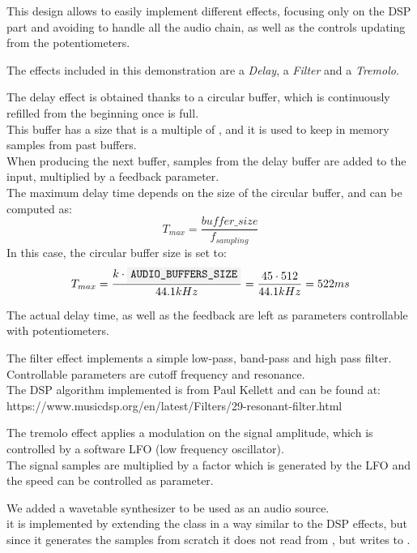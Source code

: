This design allows to easily implement different effects, focusing only on the DSP part and avoiding to handle all the audio chain, as well as the controls updating from the potentiometers.\par

The effects included in this demonstration are a \textit{Delay}, a \textit{Filter} and a \textit{Tremolo}.

The delay effect is obtained thanks to a circular buffer, which is continuously refilled from the beginning once is full.\\
This buffer has a size that is a multiple of , and it is used to keep in memory samples from past buffers.\\
When producing the next buffer, samples from the delay buffer are added to the input, multiplied by a feedback parameter.\\
The maximum delay time depends on the size of the circular buffer, and can be computed as:
$$T_{max} = \frac{buffer\_size}{f_{sampling}}$$
In this case, the circular buffer size is set to:
$$T_{max} = \frac{k\cdot\code{AUDIO\_BUFFERS\_SIZE}}{44.1  kHz} = \frac{45\cdot512}{44.1  kHz} = 522 ms$$

The actual delay time, as well as the feedback are left as parameters controllable with potentiometers.

The filter effect implements a simple low-pass, band-pass and high pass filter.\\
Controllable parameters are cutoff frequency and resonance. \\
The DSP algorithm implemented is from Paul Kellett and can be found at:  \\
https://www.musicdsp.org/en/latest/Filters/29-resonant-filter.html


The tremolo effect applies a modulation on the signal amplitude, which is controlled by a software LFO (low frequency oscillator).\\
The signal samples are multiplied by a factor which is generated by the LFO and the speed can be controlled as parameter.

We added a wavetable synthesizer to be used as an audio source.\\
it is implemented by extending the  class in a way similar to the DSP effects, but since it generates the samples from scratch it does not read from , but writes to .\par


